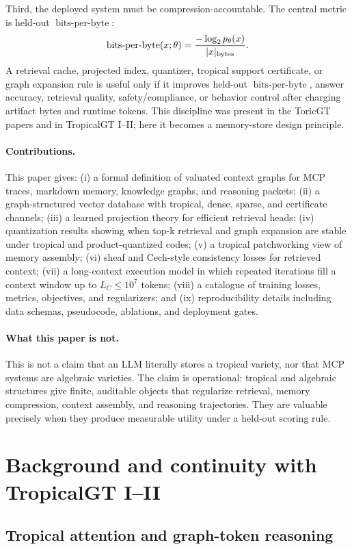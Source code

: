 \documentclass[11pt]{article}
\theoremstyle{definition}
\theoremstyle{remark}
\newcommand{\bits}{\ensuremath{\operatorname{bits\text{-}per\text{-}byte}}}
\newcommand{\LC}{L_C}
\begin{document}
Third, the deployed system must be compression-accountable. The central metric is held-out \bits:
\[
\bits(x;\theta)=\frac{-\log_2 p_\theta(x)}{|x|_{\rm bytes}}.
\]
A retrieval cache, projected index, quantizer, tropical support certificate, or graph expansion rule is useful only if it improves held-out \bits, answer accuracy, retrieval quality, safety/compliance, or behavior control after charging artifact bytes and runtime tokens. This discipline was present in the ToricGT papers and in TropicalGT I--II; here it becomes a memory-store design principle.

\paragraph{Contributions.}
This paper gives: (i) a formal definition of valuated context graphs for MCP traces, markdown memory, knowledge graphs, and reasoning packets; (ii) a graph-structured vector database with tropical, dense, sparse, and certificate channels; (iii) a learned projection theory for efficient retrieval heads; (iv) quantization results showing when top-k retrieval and graph expansion are stable under tropical and product-quantized codes; (v) a tropical patchworking view of memory assembly; (vi) sheaf and Cech-style consistency losses for retrieved context; (vii) a long-context execution model in which repeated iterations fill a context window up to \(\LC\le 10^7\) tokens; (viii) a catalogue of training losses, metrics, objectives, and regularizers; and (ix) reproducibility details including data schemas, pseudocode, ablations, and deployment gates.

\paragraph{What this paper is not.}
This is not a claim that an LLM literally stores a tropical variety, nor that MCP systems are algebraic varieties. The claim is operational: tropical and algebraic structures give finite, auditable objects that regularize retrieval, memory compression, context assembly, and reasoning trajectories. They are valuable precisely when they produce measurable utility under a held-out scoring rule.

\section{Background and continuity with TropicalGT I--II}

\subsection{Tropical attention and graph-token reasoning}
\end{document}
